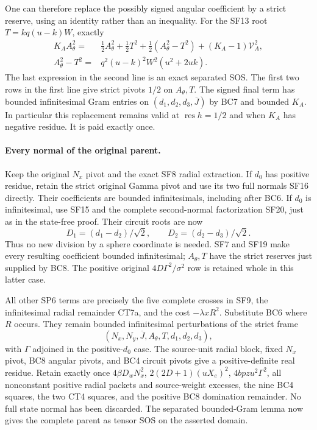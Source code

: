 One can therefore replace the possibly signed angular coefficient
by a strict reserve, using an identity rather than an inequality.
For the SF13 root $T=kq(u-k)W$, exactly
\[
\begin{split}
 K_AA_\theta^2={}&\tfrac12 A_\theta^2+\tfrac12 T^2
       +\tfrac12(A_\theta^2-T^2)
       +(K_A-1)\mathcal V_A^2,\\
 A_\theta^2-T^2={}&q^2(u-k)^2W^2(u^2+2uk).
\end{split}\tag{BC8}
\]
The last expression in the second line is an exact separated SOS.
The first two rows in the first line give strict pivots $1/2$ on
$A_\theta,T$. The signed final term has bounded infinitesimal Gram
entries on $(d_1,d_2,d_3,\overline J)$ by BC7 and bounded $K_A$.
In particular this replacement remains valid at $\operatorname{res}h=1/2$
and when $K_A$ has negative residue. It is paid exactly once.

\paragraph{Every normal of the original parent.}
Keep the original $N_x$ pivot and the exact SF8 radial extraction.
If $d_0$ has positive residue, retain the strict original Gamma
pivot and use its two full normals SF16 directly. Their coefficients
are bounded infinitesimals, including after BC6. If $d_0$ is
infinitesimal, use SF15 and the complete second-normal factorization
SF20, just as in the state-free proof. Their circuit roots are now
\[
 D_1=(d_1-d_2)/\sqrt2,\qquad
 D_2=(d_2-d_3)/\sqrt2.
 \tag{BC9}
\]
Thus no new division by a sphere coordinate is needed. SF7 and SF19
make every resulting coefficient bounded infinitesimal; $A_\theta,T$
have the strict reserves just supplied by BC8. The positive original
$4D\Gamma^2/\sigma^2$ row is retained whole in this latter case.

All other SP6 terms are precisely the five complete crosses in SF9,
the infinitesimal radial remainder CT7a, and the cost
$-\lambda xR^2$. Substitute BC6 where $R$ occurs. They remain
bounded infinitesimal perturbations of the strict frame
\[
 (N_x,N_y,\overline J,A_\theta,T,d_1,d_2,d_3),
 \tag{BC10}
\]
with $\Gamma$ adjoined in the positive-$d_0$ case. The source-unit
radial block, fixed $N_x$ pivot, BC8 angular pivots, and BC4 circuit
pivots give a positive-definite real residue. Retain exactly once
$4\beta D_wN_x^2$, $2(2D+1)(uX_e)^2$, $4bpzu^2\Gamma^2$,
all nonconstant positive radial packets and source-weight excesses,
the nine BC4 squares, the two CT4 squares, and the positive BC8
domination remainder. No full state normal has been discarded.
The separated bounded-Gram lemma now gives the complete parent
as tensor SOS on the asserted domain.

